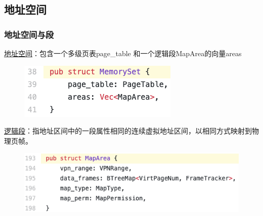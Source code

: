 \subsection{地址空间}
\begin{frame}
    \frametitle{地址空间与段}
% 
\href{https://rcore-os.github.io/rCore-Tutorial-Book-v3/chapter4/5kernel-app-spaces.html\#id5}{地址空间}：包含一个多级页表page\_table 和一个逻辑段MapArea的向量areas
% 
    \begin{figure}
        \centering
        \includegraphics[width=0.4\linewidth]{figs/memory_set-L38.png}
    \end{figure}
% 
% 
% 
% 
\href{https://rcore-os.github.io/rCore-Tutorial-Book-v3/chapter4/5kernel-app-spaces.html\#id4}{逻辑段}：指地址区间中的一段属性相同的连续虚拟地址区间，以相同方式映射到物理页帧。
% 
    \begin{figure}
        \centering
        \includegraphics[width=0.6\linewidth]{figs/memory_set-L193.png}
    \end{figure}
% 
\end{frame}

